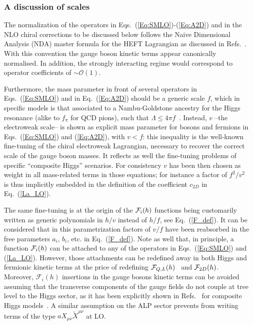 \documentclass[11pt]{article}
\newcommand{\F}{\mathcal{F}}
\renewcommand{\[}{\begin{equation}}
\renewcommand{\]}{\end{equation}}
\def\cF{{\cal F}}
\begin{document}

\subsubsection*{A discussion of scales}
%
The normalization of the operators in Eqs.~(\ref{Eq:SMLO})-(\ref{Eq:A2D}) and in the NLO chiral corrections to be 
discussed below follows the Naive Dimensional Analysis (NDA) master formula for the HEFT 
Lagrangian as discussed in Refs.~\cite{Manohar:1983md,Luty:1997fk,Cohen:1997rt,Gavela:2016bzc}. 
With this convention the gauge boson kinetic terms appear canonically normalised. 
 In addition,  
  the strongly interacting regime would correspond to operator coefficients of $\sim\mathcal{O}(1)$.
  
Furthermore, the mass parameter in front of several operators in  Eqs.~(\ref{Eq:SMLO})  and in Eq.~(\ref{Eq:A2D}) 
should be a generic scale $f$, which in specific models  is that associated  to a Nambu-Goldstone ancestry for the Higgs resonance (alike to $f_\pi$ for QCD pions),  
such that $\Lambda\le4\pi f$~\cite{Manohar:1983md}. Instead,  $v$  --the electroweak scale-- is shown as explicit mass 
parameter for bosons and fermions in  Eqs.~(\ref{Eq:SMLO}) and (\ref{Eq:A2D}), with $v< f$: this inequality is the well-known fine-tuning 
of the chiral electroweak Lagrangian, necessary to recover the correct scale of the gauge boson masses.  It reflects as well the fine-tuning 
problems of specific ``composite Higgs'' scenarios. For consistency $v$ has been then chosen as weight in all mass-related terms in those equations; 
for instance  a factor of $f^2/v^2$ is thus implicitly embedded in the definition of  the coefficient $c_{2D}$ in Eq.~(\ref{La_LO}).


The same fine-tuning is at the origin of the $\cF_i(h)$ functions being customarily written as generic polynomials in $h/v$ instead of $h/f$, see Eq.~(\ref{F_def}).  
 It can be considered that in this parametrization factors of $v/f$ have been reabsorbed in the free parameters $a_i$, $b_i$, etc. in Eq.~(\ref{F_def}). Note as well that, in principle, a function $\cF_i(h)$ can be attached to any of the operators in 
Eqs.~(\ref{Eq:SMLO})  and  (\ref{La_LO}). However, those attachments  can be redefined away  
in both Higgs and fermionic kinetic terms  at the price of 
redefining $\cF_{Q,L}(h)$~\cite{Giudice:2007fh} and $\cF_{2D}(h)$. Moreover, $\F_i(h)$ insertions in the gauge bosons kinetic terms can be avoided assuming 
that the transverse components of the gauge fields do not couple at tree level to the Higgs sector, as it has been explicitly shown in 
Refs.~\cite{Alonso:2014wta,Hierro:2015nna} for composite Higgs models~\cite{Kaplan:1983fs,Kaplan:1983sm,Banks:1984gj}.  A similar 
assumption on the ALP sector prevents from writing terms of the type $a X_{\mu\nu}\tilde X^{\mu\nu}$ at LO. 
\end{document}
